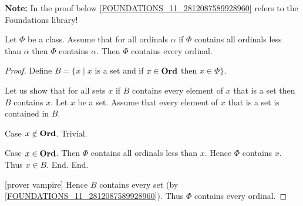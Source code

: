 \documentclass[10pt]{article}
\begin{document}
  \noindent \textbf{Note:} In the proof below
  \ref{FOUNDATIONS_11_2812087589928960} refers to the Foundations library!

  \begin{forthel}
    \begin{theorem}
      Let $\Phi$ be a class.
      Assume that for all ordinals $\alpha$ if $\Phi$ contains all ordinals
      less than $\alpha$ then $\Phi$ contains $\alpha$.
      Then $\Phi$ contains every ordinal.
    \end{theorem}
    \begin{proof}
      Define $B = \{ x \mid x$ is a set and if $x \in \textbf{Ord}$ then
      $x \in \Phi \}$.

      Let us show that for all sets $x$ if $B$ contains every element of $x$
      that is a set then $B$ contains $x$.
        Let $x$ be a set.
        Assume that every element of $x$ that is a set is contained in $B$.

        Case $x \notin \textbf{Ord}$. Trivial.

        Case $x \in \textbf{Ord}$.
          Then $\Phi$ contains all ordinals less than $x$.
          Hence $\Phi$ contains $x$.
          Thus $x \in B$.
        End.
      End.

      [prover vampire]
      Hence $B$ contains every set (by \ref{FOUNDATIONS_11_2812087589928960}).
      Thus $\Phi$ contains every ordinal.
    \end{proof}
  \end{forthel}
\end{document}
